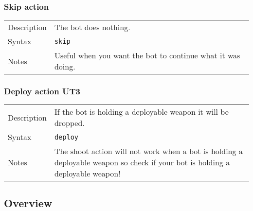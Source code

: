 \documentclass[11pt,a4paper]{article}
\begin{document}
\subsubsection*{Skip action} 	
\begin{small}
\begin{tabular}{p{2cm}p{9cm}}
Description & The bot does nothing.\\
Syntax & \verb|skip|\\
Notes & 
		Useful when you want the bot to continue what it was doing.\\
\end{tabular}
\end{small}

\subsubsection*{Deploy action UT3} 	
\begin{small}
\begin{tabular}{p{2cm}p{9cm}}
Description & If the bot is holding a deployable weapon it will be dropped.\\
Syntax & \verb|deploy|\\
Notes & 
		The shoot action will not work when a bot is holding a deployable weapon so check if your bot is holding a deployable weapon!\\
\end{tabular}
\end{small}


\subsection{Overview}
\label{sec:actionsoverview}
\end{document}

